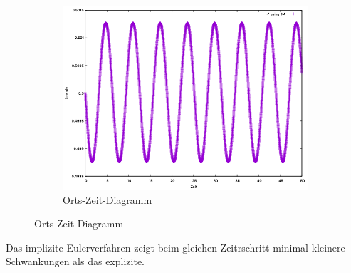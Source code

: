 \documentclass[
    oneside,
    ngerman,
    footinclude=false,
    captions=tableheading,
    DIV=12
]{scrartcl}
\begin{document}
            \begin{figure}[H]
            \centering
            \begin{subfigure}[b]{0.45\textwidth}
                \centering
                \includegraphics[width=\textwidth]{Bilddateien/impEulerA1(a)-001h-E.png}
                \caption{Orts-Zeit-Diagramm}
                \label{fig:impEulerA1(a)-0001-0-E}
            \end{subfigure}
            \end{figure}
            Das implizite Eulerverfahren zeigt beim gleichen Zeitrschritt minimal kleinere Schwankungen als das explizite.
\end{document}

